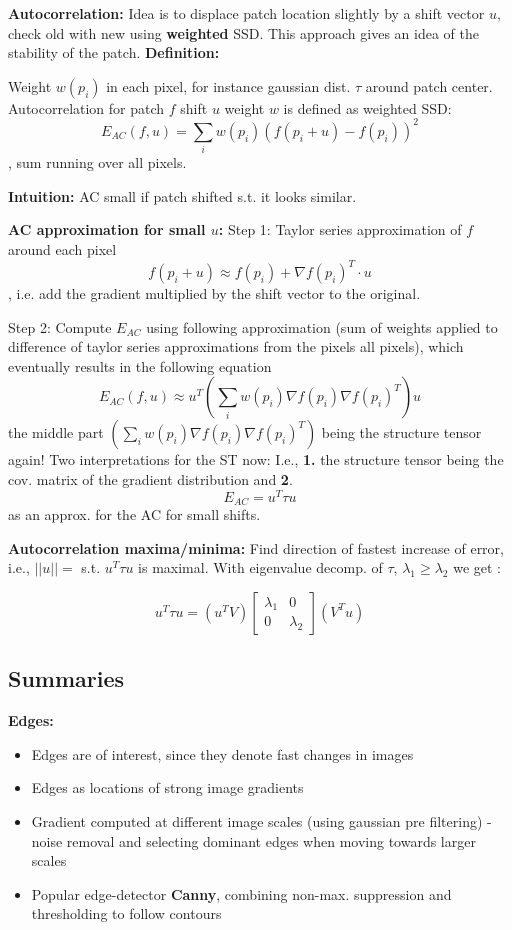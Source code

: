 \textbf{Autocorrelation:} Idea is to displace patch location slightly by a shift vector $u$, check old with new using \textbf{weighted} SSD. This approach gives an idea of the stability of the patch. \textbf{Definition:}

Weight $w(p_i)$ in each pixel, for instance gaussian dist. $\tau$ around patch center. Autocorrelation for patch $f$ shift $u$ weight $w$ is defined as weighted SSD: $$E_{AC} (f,u) = \sum_i w(p_i)(f(p_i+u)-f(p_i))^2$$, sum running over all pixels.

\textbf{Intuition:} AC small if patch shifted s.t. it looks similar.

\textbf{AC approximation for small $u$:} Step 1: Taylor series approximation of $f$ around each pixel $$f(p_i + u) \approx f(p_i) + \nabla f(p_i)^T \cdot u$$, i.e. add the gradient multiplied by the shift vector to the original.

Step 2: Compute $E_{AC}$ using following approximation (sum of weights applied to difference of taylor series approximations from the pixels all pixels), which eventually results in the following equation $$E_{AC}(f,u) \approx u^T \left(\sum_i w(p_i) \nabla f(p_i) \nabla f(p_i)^T\right) u$$ the middle part $\left(\sum_i w(p_i) \nabla f(p_i) \nabla f(p_i)^T\right)$ being the structure tensor again! Two interpretations for the ST now: I.e., \textbf{1.} the structure tensor being the cov. matrix of the gradient distribution and \textbf{2}. $$E_{AC} = u^T \tau u$$ as an approx. for the AC for small shifts.

\textbf{Autocorrelation maxima/minima:} Find direction of fastest increase of error, i.e., $||u|| = $ s.t. $u^T \tau u $ is maximal. With eigenvalue decomp. of $\tau$, $\lambda_1 \geq \lambda_2$ we get :

$$u^T \tau u = (u^T V) \left[\begin{matrix} \lambda_1 & 0 \\ 0 & \lambda_2 \end{matrix}\right] (V^T u)$$

\subsection{Summaries}

\textbf{Edges:} \begin{itemize}
    \item Edges are of interest, since they denote fast changes in images
    \item Edges as locations of strong image gradients
    \item Gradient computed at different image scales (using gaussian pre filtering) - noise removal and selecting dominant edges when moving towards larger scales
    \item Popular edge-detector \textbf{Canny}, combining non-max. suppression and thresholding to follow contours
\end{itemize}

